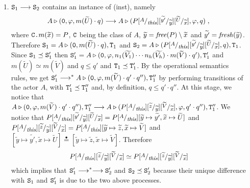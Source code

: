 \documentclass{LMCS}
\theoremstyle{plain}\newtheorem{proposition}[thm]{Proposition}
\theoremstyle{plain}\newtheorem{lemma}[thm]{Lemma}
\theoremstyle{plain}\newtheorem{theorem}[thm]{Theorem}
\theoremstyle{plain}\newtheorem{corollary}[thm]{Corollary}
\newcommand{\rulename}[1]{{\sc(#1)}}
\newcommand{\subst}[2]{[\raisebox{.5ex}{\footnotesize$#1$}  /
                        \raisebox{-.5ex}{\footnotesize$#2$} ]}
\newcommand{\pinull}{{\tt 0}}
\newcommand{\prefix}{\mbox{\tt .}}
\newcommand{\State}{{\tt S}}
\newcommand{\StateT}{{\tt T}}
\newcommand{\lred}[1]{\stackrel{#1}{\longrightarrow}}
\newcommand{\fresh}[1]{{\it fresh}(#1)}
\newcommand{\free}[1]{{\it free}(#1)}
\newcommand{\wt}[1]{\widetilde{#1}}
\newcommand{\adef}[1]{{\tt #1}}
\newcommand{\eqdot}{\stackrel{\bullet}{=}}
\begin{document}
\begin{enumerate}
\item
$\State_1 \lred{} \State_2$ contains an instance of \rulename{inst}, namely
\[A \triangleright (\pinull, \varphi, m(\wt{U}) \cdot q) \lred{} A \triangleright (
P\subst{A}{{\it this}}\subst{\wt{y'}}{\wt{y}}\subst{\wt{U}}{\wt{x}}, \varphi, q)\;,\]
where $\adef{C} \prefix m(\wt{x}) = P$, $\adef{C}$ being the class of $A$,
$\wt{y} = \free{P} \setminus \wt{x}$ and $\wt{y'} = \fresh{\wt{y}}$.
Therefore $\State_1 = A \triangleright (\pinull, m(\wt{U}) \cdot q),
\StateT_1$ and $\State_2 = A \triangleright (
P\subst{A}{{\it this}}\subst{\wt{y'}}{\wt{y}}\subst{\wt{U}}{\wt{x}}, q), \StateT_1$. 
Since $\State_1 
\preceq \State_1'$ then $\State_1' = A \triangleright (\pinull, \varphi, 
n_1(\wt{V_1}) \cdots
n_h(\wt{V_h}) \cdot  m(\wt{V}) \cdot q'), \StateT_1'$ and 
$m(\wt{U}) \simeq m(\wt{V})$ and $q \leq q'$ and $\StateT_1 \preceq 
\StateT_1'$. By the operational semantics rules, we get
$\State_1' \lred{}^* A \triangleright (\pinull, \varphi, 
m(\wt{V}) \cdot q' \cdot q''), \StateT_1''$ 
by performing transitions of the actor $A$, with $\StateT_1' \preceq \StateT_1''$ 
and, by definition, $q \leq
q' \cdot q''$. At this stage, we notice that $A \triangleright (\pinull, 
\varphi, m(\wt{V}) 
\cdot q' \cdot q''), \StateT_1'' \lred{} A \triangleright (P
\subst{A}{{\it this}}\subst{\wt{z}}{\wt{y}} \subst{\wt{V}}{\wt{x}}, \varphi, 
q' \cdot q''), \StateT_1''$. We notice that
$P\subst{A}{{\it this}}\subst{\wt{y'}}{\wt{y}}\subst{\wt{U}}{\wt{x}} 
= P \subst{A}{{\it this}} [ \wt{y} \mapsto \wt{y'}, \wt{x} \mapsto \wt{U}]$
and
$P\subst{A}{{\it this}}\subst{\wt{z}}{\wt{y}}\subst{\wt{V}}{\wt{x}}
= P \subst{A}{{\it this}} [ \wt{y} \mapsto \wt{z}, \wt{x} \mapsto \wt{V}]$
and
$[ \wt{y} \mapsto \wt{y'}, \wt{x} \mapsto \wt{U}] \eqdot 
[ \wt{y} \mapsto \wt{z}, \wt{x} \mapsto \wt{V}]$.
Therefore 
\[
P\subst{A}{{\it this}}\subst{\wt{z}}{\wt{y}}\subst{\wt{V}}{\wt{x}}
\simeq 
P\subst{A}{{\it this}}\subst{\wt{z}}{\wt{y}}\subst{\wt{V}}{\wt{x}}
\]
which implies that $\State_1' \lred{}^*\lred{} \State_2'$ and $\State_2  \preceq
\State_2'$
because their unique difference with $\State_1$ and $\State_1'$
is due to the two above processes.


\end{enumerate}
\end{document}
